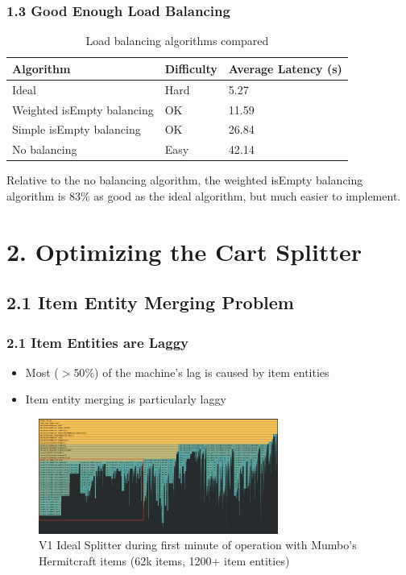 \documentclass[aspectratio=169]{beamer}
\begin{document}
\begin{frame}
    \frametitle{1.3 Good Enough Load Balancing}

    \begin{table}
        \begin{tabular}{l l l}
            \toprule
            \textbf{Algorithm} & \textbf{Difficulty} & \textbf{Average Latency (s)}\\
            \midrule
            Ideal & Hard & 5.27 \\
            Weighted isEmpty balancing & OK & 11.59 \\
            Simple isEmpty balancing & OK & 26.84 \\
            No balancing & Easy & 42.14 \\
            \bottomrule
        \end{tabular}
        \caption{Load balancing algorithms compared}
    \end{table}

    Relative to the no balancing algorithm, the weighted isEmpty balancing algorithm is 83\% as good as the ideal algorithm, but much easier to implement.
\end{frame}

\section{2. Optimizing the Cart Splitter}
\subsection{2.1 Item Entity Merging Problem}

\begin{frame}
    \frametitle{2.1 Item Entities are Laggy}
    \begin{itemize}
        \item Most ($>50\%$) of the machine's lag is caused by item entities
        \item Item entity merging is particularly laggy
    \end{itemize}

    \begin{figure}
        \centering
        \includegraphics[width=0.7\textwidth]{itemlag.png}
        \caption{V1 Ideal Splitter during first minute of operation with Mumbo's Hermitcraft items (62k items, 1200+ item entities)}
    \end{figure}
\end{frame}
\end{document}
